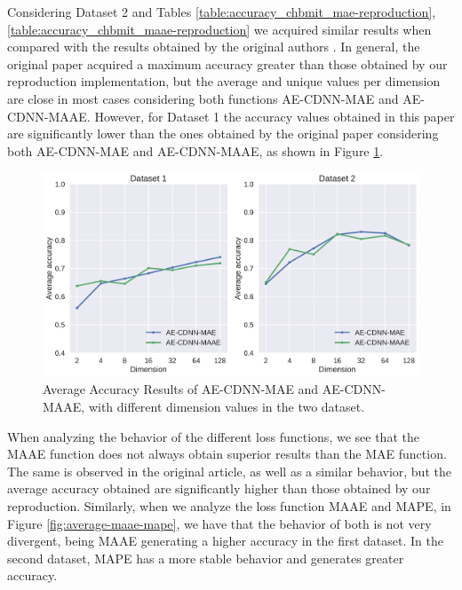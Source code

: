 \newpage

Considering Dataset 2 and Tables \ref{table:accuracy_chbmit_mae-reproduction}, \ref{table:accuracy_chbmit_maae-reproduction} we acquired similar results when compared with the results obtained by the original authors \cite{WenZha:2018}. In general, the original paper acquired a maximum accuracy greater than those obtained by our reproduction implementation, but the average and unique values per dimension are close in most cases considering both functions AE-CDNN-MAE and AE-CDNN-MAAE. However, for Dataset 1 the accuracy values obtained in this paper are significantly lower than the ones obtained by the original paper considering both AE-CDNN-MAE and AE-CDNN-MAAE, as shown in Figure \ref{fig:average}. 

\newpage


\begin{figure}[!ht]
\centering
\includegraphics[width=0.8\linewidth]{figure/average-MAE-MAAE.pdf}
  \caption{Average Accuracy Results of AE-CDNN-MAE and AE-CDNN-MAAE, with different dimension values in the two dataset.}
\label{fig:average}
\end{figure}

When analyzing the behavior of the different loss functions, we see that the MAAE function does not always obtain superior results than the MAE function. The same is observed in the original article, as well as a similar behavior, but the average accuracy obtained are significantly higher than those obtained by our reproduction. Similarly, when we analyze the loss function MAAE and MAPE, in Figure \ref{fig:average-maae-mape}, we have that the behavior of both is not very divergent, being MAAE generating a higher accuracy in the first dataset. In the second dataset, MAPE has a more stable behavior and generates greater accuracy. 


